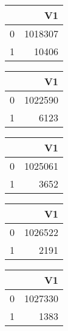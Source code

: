 \bigskip\bigskip
\centering
\begin{tabular}{rr}
  \hline
 & V1 \\ 
  \hline
0 & 1018307 \\ 
  1 & 10406 \\ 
   \hline
\end{tabular}

\bigskip\bigskip
\centering
\begin{tabular}{rr}
  \hline
 & V1 \\ 
  \hline
0 & 1022590 \\ 
  1 & 6123 \\ 
   \hline
\end{tabular}

\bigskip\bigskip
\centering
\begin{tabular}{rr}
  \hline
 & V1 \\ 
  \hline
0 & 1025061 \\ 
  1 & 3652 \\ 
   \hline
\end{tabular}

\bigskip\bigskip
\centering
\begin{tabular}{rr}
  \hline
 & V1 \\ 
  \hline
0 & 1026522 \\ 
  1 & 2191 \\ 
   \hline
\end{tabular}

\bigskip\bigskip
\centering
\begin{tabular}{rr}
  \hline
 & V1 \\ 
  \hline
0 & 1027330 \\ 
  1 & 1383 \\ 
   \hline
\end{tabular}

